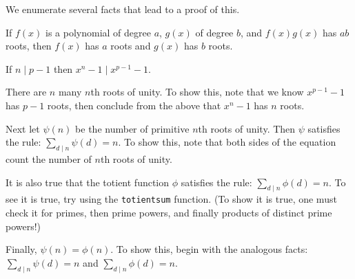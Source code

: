 \documentclass[12pt]{exam}
\begin{document}
\begin{questions}
  We enumerate several facts that lead to a proof of this.
  \begin{parts}
    \item If $f(x)$ is a polynomial of degree $a$, $g(x)$ of degree $b$, and $f(x)g(x)$ has $ab$ roots, then $f(x)$ has $a$ roots and $g(x)$ has $b$ roots.
    \item If $n\mid p-1$ then $x^n-1\mid x^{p-1}-1$.
    \item There are $n$ many $n$th roots of unity. To show this, note that we know $x^{p-1}-1$ has $p-1$ roots, then conclude from the above that $x^n-1$ has $n$ roots.
    \item Next let $\psi(n)$ be the number of primitive $n$th roots of unity. Then $\psi$ satisfies the rule: $\sum_{d\mid n}\psi(d)=n$. To show this, note that both sides of the equation count the number of $n$th roots of unity.
    \item It is also true that the totient function $\phi$ satisfies the rule: $\sum_{d\mid n}\phi(d)=n$. To see it is true, try using the \texttt{totientsum} function. (To show it is true, one must check it for primes, then prime powers, and finally products of distinct prime powers!)
    \item Finally, $\psi(n)=\phi(n)$. To show this, begin with the analogous facts: $\sum_{d\mid n}\psi(d)=n$ and $\sum_{d\mid n}\phi(d)=n$.
  \end{parts} 
\end{questions}
\end{document}
